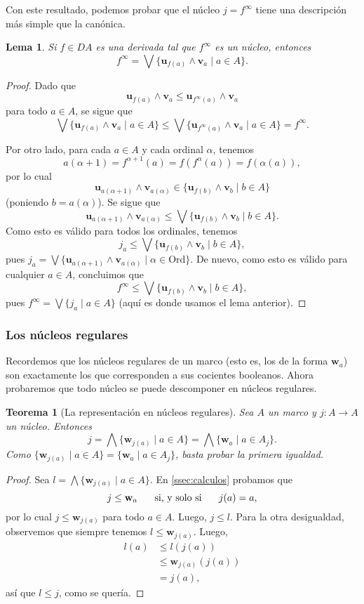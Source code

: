 \documentclass[12pt,letterpaper,titlepage]{article}
\newtheorem{lemma}{Lema}
\newtheorem{thm}{Teorema}
\theoremstyle{definition}
\newcommand\Sup{\bigvee}
\renewcommand\inf{\wedge}
\newcommand\Inf{\bigwedge}
\newcommand\ssi{\hspace{5mm}\text{ si, y solo si }\hspace{5mm}}
\newcommand\unuc[1]{\mathbf u_{#1}}
\newcommand\vnuc[1]{\mathbf v_{#1}}
\newcommand\wnuc[1]{\mathbf w_{#1}}
\newcommand\<{\langle}
\renewcommand\>{\rangle}
\newcommand{\Ord}{\mathrm{Ord}}
\begin{document}
Con este resultado, podemos probar que el núcleo $j=f^\infty$
tiene una descripción más simple que la canónica.

\begin{lemma}
  Si $f\in DA$ es una derivada tal que $f^\infty$ es un núcleo,
  entonces
  \[
    f^\infty = \Sup\{\unuc{f(a)}\inf\vnuc a \mid a\in A\}
  .\]
\end{lemma}
\begin{proof}
  Dado que
  \[
    \unuc{f(a)}\inf\vnuc a\leq \unuc{f^\infty(a)}\inf\vnuc a
  \]
  para todo $a\in A$, se sigue que
  \[
    \Sup\{\unuc{f(a)}\inf\vnuc a \mid a\in A\}
    \leq
    \Sup\{\unuc{f^\infty(a)}\inf\vnuc a \mid a\in A\}
    = f^\infty
  .\]

  Por otro lado, para cada $a\in A$ y cada ordinal $\alpha$, tenemos
  \[
    a(\alpha+1)=f^{\alpha+1}(a)=f(f^\alpha(a))=f(\alpha(a))
  ,\]
  por lo cual
  \[
     \unuc{a(\alpha+1)}\inf\vnuc{a(\alpha)}
     \in
     \{\unuc{f(b)}\inf\vnuc b \mid b\in A\}
  \]
  (poniendo $b=a(\alpha)$).
  Se sigue que
  \[
     \unuc{a(\alpha+1)}\inf\vnuc{a(\alpha)}
     \leq
     \Sup\{\unuc{f(b)}\inf\vnuc b \mid b\in A\}
  .\]
  Como esto es válido para todos los ordinales, tenemos
  \[
     j_a\leq \Sup\{\unuc{f(b)}\inf\vnuc b \mid b\in A\}
  ,\]
  pues $j_a = \Sup\{\unuc{a(\alpha+1)}\inf\vnuc{a(\alpha)}
   \mid\alpha\in\Ord\}$.
  De nuevo, como esto es válido para cualquier $a\in A$, concluimos
  que
  \[
     f^\infty\leq \Sup\{\unuc{f(b)}\inf\vnuc b \mid b\in A\}
  ,\]
  pues $f^\infty = \Sup\{j_a\mid a\in A\}$ (aquí es donde usamos
  el lema anterior).
\end{proof}

\subsubsection{Los núcleos regulares}

Recordemos que los núcleos regulares de un marco
(esto es, los de la forma $\wnuc a$) son exactamente
los que corresponden a sus cocientes booleanos.
Ahora probaremos que todo núcleo se puede descomponer en
núcleos regulares.

\begin{thm}[La representación en núcleos regulares]
    Sea $A$ un marco y $j:A\to A$ un núcleo.
    Entonces
    \[
        j
        = \Inf\{\wnuc{j(a)}\mid a\in A\}
        = \Inf\{\wnuc a\mid a\in A_j\}
    .\]
    Como $\{\wnuc{j(a)}\mid a\in A\}=\{\wnuc a \mid a\in A_j\}$,
    basta probar la primera igualdad.
\end{thm}
\begin{proof}
    Sea $l = \Inf\{\wnuc{j(a)}\mid a\in A\}$.
    En \ref{ssec:calculos} probamos que
    \[
        j\leq\wnuc a \ssi j(a) = a
    ,\]
    por lo cual $j\leq \wnuc{j(a)}$ para todo $a\in A$.
    Luego, $j\leq l$.
    Para la otra desigualdad,
    observemos que siempre tenemos $l\leq\wnuc{j(a)}$.
    Luego,
    \begin{align*}
        l(a)
        &\leq l(j(a)) \\
        &\leq \wnuc{j(a)}(j(a)) \\
        &= j(a),
    \end{align*}
    así que $l\leq j$, como se quería.
\end{proof}
\end{document}
